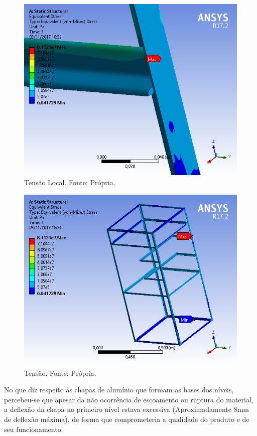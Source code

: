   \begin{figure}[H]
    \centering
    \includegraphics[scale= 0.6]{figuras/estrutura/tensao-local.png}
    \caption{Tensão Local. Fonte: Própria.}
    \label{modelagem}
  \end{figure}

  \begin{figure}[H]
    \centering
    \includegraphics[scale= 0.6]{figuras/estrutura/tensao.png}
    \caption{Tensão. Fonte: Própria.}
    \label{modelagem}
  \end{figure}

  No que diz respeito às chapas de alumínio que formam as bases dos níveis, 
  percebeu-se que apesar da não ocorrência de escoamento ou ruptura do material, 
  a deflexão da chapa no primeiro nível estava excessiva (Aproximadamente 8mm de deflexão máxima), 
  de forma que comprometeria a qualidade do produto e de seu funcionamento.


